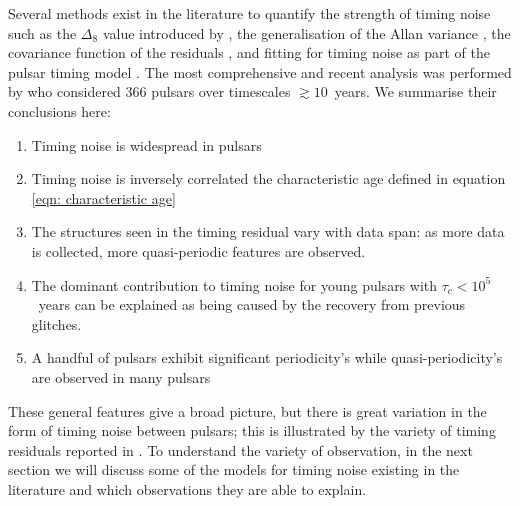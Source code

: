 Several methods exist in the literature to quantify the strength of timing
noise such as the $\Delta_{8}$ value introduced by \citet{Arzoumanian1994}, the
generalisation of the Allan variance \citep{Matsakis1997}, the covariance
function of the residuals \citep{Coles2011}, and fitting for timing noise as
part of the pulsar timing model \citep{Lentati2014}.  The most comprehensive
and recent analysis was performed by \citet{Hobbs2010} who considered 366
pulsars over timescales $\gtrsim10$~years.  We summarise their conclusions
here: \begin{enumerate}

    \item Timing noise is widespread in pulsars

    \item Timing noise is inversely correlated the characteristic age defined
in equation \ref{eqn: characteristic age}

    \item The structures seen in the timing residual vary with data span: as
more data is collected, more quasi-periodic features are observed.

    \item The dominant contribution to timing noise for young pulsars with
$\tau_{c}<10^{5}$~years can be explained as being caused by the recovery from
previous glitches.

    \item A handful of pulsars exhibit significant periodicity's while
quasi-periodicity's are observed in many pulsars

\end{enumerate}

These general features give a broad picture, but there is great variation in
the form of timing noise between pulsars; this is illustrated by the variety of
timing residuals reported in \citet{Hobbs2010}. To understand the variety of
observation, in the next section we will discuss some of the models for timing
noise existing in the literature and which observations they are able to
explain.
